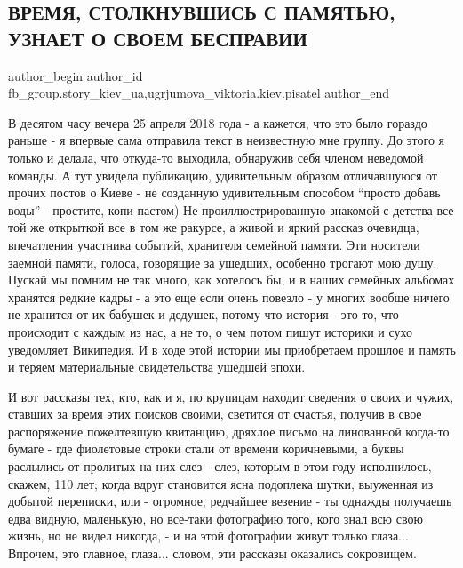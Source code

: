 
 
 
 
 
 
\subsection{ВРЕМЯ, СТОЛКНУВШИСЬ С ПАМЯТЬЮ, УЗНАЕТ О СВОЕМ БЕСПРАВИИ}
\label{sec:13_11_2019.fb.fb_group.story_kiev_ua.1.vremja}
 
\ifcmt
 author_begin
   author_id fb_group.story_kiev_ua,ugrjumova_viktoria.kiev.pisatel
 author_end
\fi

В десятом часу вечера 25 апреля 2018 года - а кажется, что это было гораздо
раньше - я впервые сама отправила текст в неизвестную мне группу. До этого я
только и делала, что откуда-то выходила, обнаружив себя членом неведомой
команды. А тут увидела публикацию, удивительным образом отличавшуюся от прочих
постов о Киеве - не созданную удивительным способом \enquote{просто добавь воды} -
простите, копи-пастом) Не проиллюстрированную знакомой с детства все той же
открыткой все в том же ракурсе, а живой и яркий рассказ очевидца, впечатления
участника событий, хранителя семейной памяти. Эти носители заемной памяти,
голоса, говорящие за ушедших, особенно трогают мою душу. Пускай мы помним не
так много, как хотелось бы, и в наших семейных альбомах хранятся редкие кадры -
а это еще если очень повезло - у многих вообще ничего не хранится от их бабушек
и дедушек, потому что история - это то, что происходит с каждым из нас, а не
то, о чем потом пишут историки и сухо уведомляет Википедия. И в ходе этой
истории мы приобретаем прошлое и память и теряем материальные свидетельства
ушедшей эпохи. 


И вот рассказы тех, кто, как и я, по крупицам находит сведения о своих и чужих,
ставших за время этих поисков своими, светится от счастья, получив в свое
распоряжение пожелтевшую квитанцию, дряхлое письмо на линованной когда-то
бумаге - где фиолетовые строки стали от времени коричневыми, а буквы раслылись
от пролитых на них слез - слез, которым в этом году исполнилось, скажем, 110
лет; когда вдруг становится ясна подоплека шутки, выуженная из добытой
переписки, или - огромное, редчайшее везение - ты однажды получаешь едва
видную, маленькую, но все-таки фотографию того, кого знал всю свою жизнь, но не
видел никогда, - и на этой фотографии живут только глаза... Впрочем, это
главное, глаза... словом, эти рассказы оказались сокровищем. 

